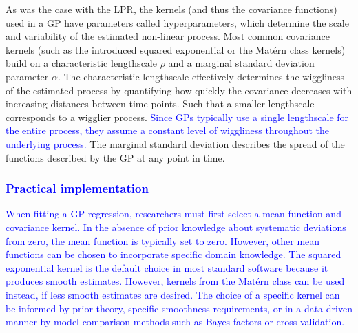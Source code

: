 \documentclass[man, floatsintext]{apa7}
\begin{document}
As was the case with the LPR, the kernels (and thus the covariance functions)
used in a GP have parameters called hyperparameters, which determine the scale
and variability of the estimated non-linear process. Most common covariance
kernels (such as the introduced squared exponential or the Matérn class
kernels) build on a characteristic lengthscale $\rho$ and a marginal standard
deviation parameter $\alpha$. The characteristic lengthscale effectively
determines the wiggliness of the estimated process by quantifying how quickly
the covariance decreases with increasing distances between time points. Such
that a smaller lengthscale corresponds to a wigglier process.
\textcolor{blue}{Since GPs typically use a single lengthscale for the entire
  process, they assume a constant level of wiggliness throughout
  the underlying process.}
The marginal standard deviation describes the spread of the functions described
by the GP at any point in time.

\subsubsection{\textcolor{blue}{Practical implementation}}

\textcolor{blue}{
  When fitting a GP regression, researchers must first select a mean function
  and covariance kernel. In the absence of prior knowledge about systematic
  deviations from zero, the mean function is typically set to zero. However,
  other mean functions can be chosen to incorporate specific domain knowledge.
  The squared exponential kernel is the default choice in most standard
  software because it produces smooth estimates. However, kernels from the
  Matérn class can be used instead, if less smooth estimates are desired.
  The choice of a specific kernel can be informed by prior
  theory, specific smoothness requirements, or in a data-driven manner by
  model comparison methods such as Bayes factors or cross-validation.
}
\end{document}
